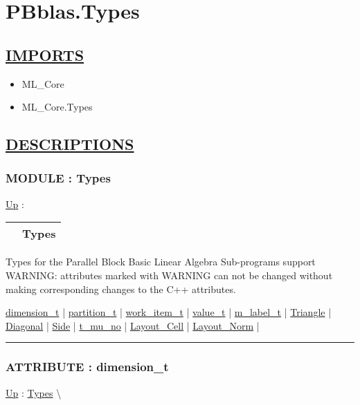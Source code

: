 \chapter*{PBblas.Types}
\hypertarget{ecldoc:toc:PBblas.Types}{}

\section*{\underline{IMPORTS}}
\begin{itemize}
\item ML\_Core
\item ML\_Core.Types
\end{itemize}

\section*{\underline{DESCRIPTIONS}}
\subsection*{MODULE : Types}
\hypertarget{ecldoc:PBblas.Types}{}
\hyperlink{ecldoc:toc:PBblas}{Up} :

{\renewcommand{\arraystretch}{1.5}
\begin{tabularx}{\textwidth}{|>{\raggedright\arraybackslash}l|X|}
\hline
\hspace{0pt} & Types \\
\hline
\end{tabularx}
}

\par
Types for the Parallel Block Basic Linear Algebra Sub-programs support WARNING: attributes marked with WARNING can not be changed without making corresponding changes to the C++ attributes.


\hyperlink{ecldoc:pbblas.types.dimension_t}{dimension\_t}  |
\hyperlink{ecldoc:pbblas.types.partition_t}{partition\_t}  |
\hyperlink{ecldoc:pbblas.types.work_item_t}{work\_item\_t}  |
\hyperlink{ecldoc:pbblas.types.value_t}{value\_t}  |
\hyperlink{ecldoc:pbblas.types.m_label_t}{m\_label\_t}  |
\hyperlink{ecldoc:ecldoc-Triangle}{Triangle}  |
\hyperlink{ecldoc:ecldoc-Diagonal}{Diagonal}  |
\hyperlink{ecldoc:ecldoc-Side}{Side}  |
\hyperlink{ecldoc:pbblas.types.t_mu_no}{t\_mu\_no}  |
\hyperlink{ecldoc:pbblas.types.layout_cell}{Layout\_Cell}  |
\hyperlink{ecldoc:pbblas.types.layout_norm}{Layout\_Norm}  |

\rule{\linewidth}{0.5pt}

\subsection*{ATTRIBUTE : dimension\_t}
\hypertarget{ecldoc:pbblas.types.dimension_t}{}
\hyperlink{ecldoc:PBblas.Types}{Up} :
\hspace{0pt} \hyperlink{ecldoc:PBblas.Types}{Types} \textbackslash 

